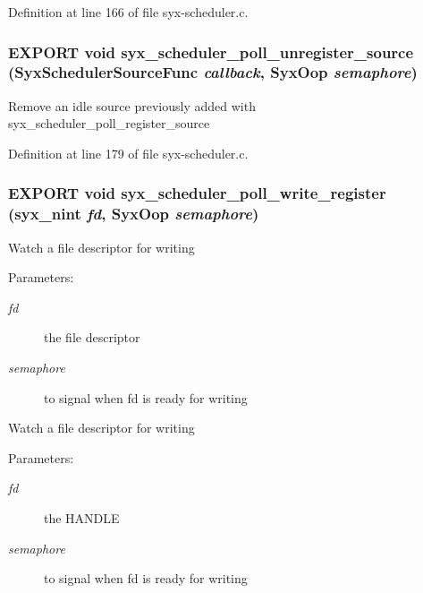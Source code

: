 Definition at line 166 of file syx-scheduler.c.\hypertarget{syx-scheduler_8h_1034940b95289f30cbbadf9737f63f3c}{
\subsubsection{\setlength{\rightskip}{0pt plus 5cm}EXPORT void syx\_\-scheduler\_\-poll\_\-unregister\_\-source ({\bf SyxSchedulerSourceFunc} {\em callback}, \/  {\bf SyxOop} {\em semaphore})}}
\label{syx-scheduler_8h_1034940b95289f30cbbadf9737f63f3c}


Remove an idle source previously added with syx\_\-scheduler\_\-poll\_\-register\_\-source 

Definition at line 179 of file syx-scheduler.c.\hypertarget{syx-scheduler_8h_7fa996684cc72d14c8d575539c027b64}{
\subsubsection{\setlength{\rightskip}{0pt plus 5cm}EXPORT void syx\_\-scheduler\_\-poll\_\-write\_\-register ({\bf syx\_\-nint} {\em fd}, \/  {\bf SyxOop} {\em semaphore})}}
\label{syx-scheduler_8h_7fa996684cc72d14c8d575539c027b64}


Watch a file descriptor for writing

\begin{Desc}
\item[Parameters:]
\begin{description}
\item[{\em fd}]the file descriptor \item[{\em semaphore}]to signal when fd is ready for writing\end{description}
\end{Desc}
Watch a file descriptor for writing

\begin{Desc}
\item[Parameters:]
\begin{description}
\item[{\em fd}]the HANDLE \item[{\em semaphore}]to signal when fd is ready for writing \end{description}
\end{Desc}



